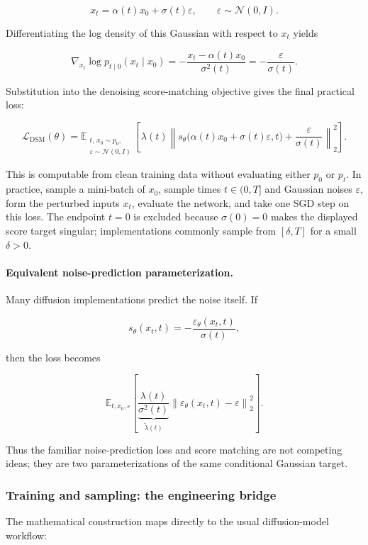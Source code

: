 \documentclass[11pt,a4paper]{article}
\theoremstyle{definition}
\begin{document}
\[
x_t=\alpha(t)x_0+\sigma(t)\varepsilon,
\qquad
\varepsilon\sim\mathcal{N}(0,I).
\]

Differentiating the log density of this Gaussian with respect to $x_t$ yields

\[
\nabla_{x_t}\log p_{t\mid 0}(x_t\mid x_0)
=-\frac{x_t-\alpha(t)x_0}{\sigma^2(t)}
=-\frac{\varepsilon}{\sigma(t)}.
\]

Substitution into the denoising score-matching objective gives the final practical loss:

\[
\mathcal{L}_{\mathrm{DSM}}(\theta)
= \mathbb{E}_{\substack{t,\,x_0\sim p_0,\\ \varepsilon\sim\mathcal{N}(0,I)}}
\left[
\lambda(t)
\left\|
s_\theta\bigl(\alpha(t)x_0+\sigma(t)\varepsilon,t\bigr)
+\frac{\varepsilon}{\sigma(t)}
\right\|_2^2
\right].
\]

This is computable from clean training data without evaluating either $p_0$ or $p_t$. In practice, sample a mini-batch of $x_0$, sample times $t\in(0,T]$ and Gaussian noises $\varepsilon$, form the perturbed inputs $x_t$, evaluate the network, and take one SGD step on this loss. The endpoint $t=0$ is excluded because $\sigma(0)=0$ makes the displayed score target singular; implementations commonly sample from $[\delta,T]$ for a small $\delta>0$.

\paragraph{Equivalent noise-prediction parameterization.}
Many diffusion implementations predict the noise itself. If

\[
s_\theta(x_t,t)=-\frac{\varepsilon_\theta(x_t,t)}{\sigma(t)},
\]

then the loss becomes

\[
\mathbb{E}_{t,x_0,\varepsilon}
\left[
\underbrace{\frac{\lambda(t)}{\sigma^2(t)}}_{\widetilde{\lambda}(t)}
\left\|\varepsilon_\theta(x_t,t)-\varepsilon\right\|_2^2
\right].
\]

Thus the familiar noise-prediction loss and score matching are not competing ideas; they are two parameterizations of the same conditional Gaussian target.

\subsubsection{Training and sampling: the engineering bridge}

The mathematical construction maps directly to the usual diffusion-model workflow:
\end{document}
